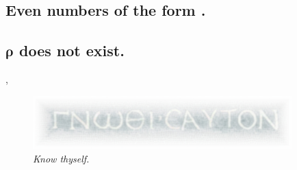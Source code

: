 \documentclass[preview]{standalone}
\begin{document}
\subsection{Even numbers of the form .}

\pagebreak


\subsection{$\bm{\rho}$ does not exist.}

\sep
\begin{figure}[h!]
    \centering
    \includegraphics[width=10cm]{../resources/jpg/1.6.introduction.to.proofs/know_thyself.jpg}
    \caption*{\emph{Know thyself.}}
\end{figure} 
\pagebreak
\thispagestyle{empty}
\end{document}
